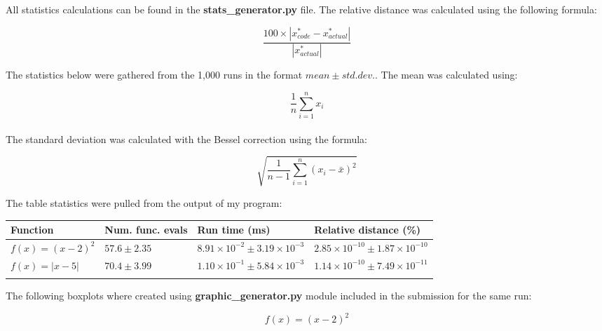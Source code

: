 \documentclass[11pt]{article}
\begin{document}
\begin{enumerate}
\begin{enumerate}
\begin{figure}[h]
\end{figure}

All statistics calculations can be found in the {\bf stats\_generator.py} file. The relative distance was calculated using the following formula:

\[\frac{100 \times |x^{*}_{code} - x^{*}_{actual}|}{ {| x^{*}_{actual}|}}\]

 

The statistics below were gathered from the 1,000 runs in the format ${mean} \pm {std. dev.}$. The mean was calculated using:

$$\frac{1}{n} \sum_{i=1}^{n} x_{i}$$
\\
The standard deviation was calculated with the Bessel correction using the formula:

$$\sqrt{ \frac{1}{n - 1} \sum_{i = 1}^{n} (x_{i} - \bar{x})^2}$$

The table statistics were pulled from the output of my program: 
\vspace{5mm}

\begin{tabular}{*4l}    \toprule


	Function    & Num. func. evals  & Run time (ms)  & Relative distance (\%) \\\toprule
	$f(x) = (x - 2)^2$& $57.6 \pm 2.35$ & $8.91 \times 10^{-2} \pm 3.19 \times 10^{-3}$ & $2.85 \times 10^{-10} \pm 1.87 \times 10^{-10}$\\
	$f(x) = |x - 5|$ & $70.4 \pm 3.99$ & $1.10 \times 10^{-1} \pm 5.84 \times 10^{-3}$  & $1.14 \times 10^{-10} \pm 7.49 \times 10^{-11}$\\\\

\end{tabular}

\vspace{5mm}

The following boxplots where created using {\bf graphic\_generator.py} module included in the submission for the same run:

\[f(x) = (x - 2)^2 \]


\end{enumerate}
\end{enumerate}
\end{document}
